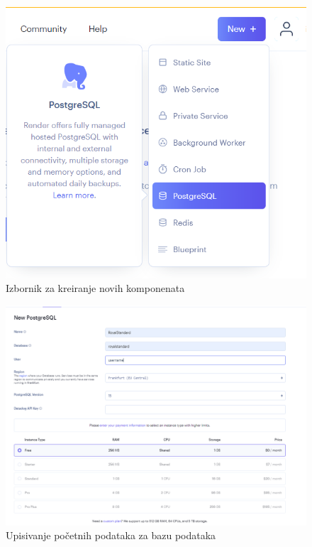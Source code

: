 			\begin{figure}[H]
				\includegraphics[width=\textwidth]{slike/IzbordnikNew.PNG} 
				\caption{Izbornik za kreiranje novih komponenata}
				\label{fig:Izbornik}
			\end{figure}
		
		\begin{figure}[H]
			\includegraphics[width=\textwidth]{slike/OsnovniPodaciBaza.PNG} 
			\caption{Upisivanje početnih podataka za bazu podataka}
			\label{fig:Početni podaci za bazu podataka}
		\end{figure}
		
